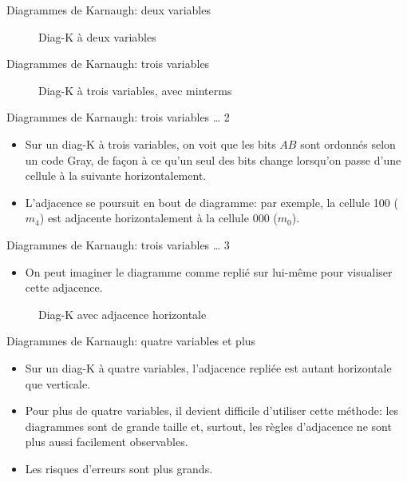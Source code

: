 \documentclass[presentation]{beamer}
\begin{document}
\begin{frame}[label={sec:org0bd4562}]{Diagrammes de Karnaugh: deux variables}
\begin{figure}[htbp]
\centering

\caption{\label{fig:orgc855133}Diag-K à deux variables}
\end{figure}
\end{frame}

\begin{frame}[label={sec:org5d40564}]{Diagrammes de Karnaugh: trois variables}
\begin{figure}[htbp]
\centering

\caption{\label{fig:org7891238}Diag-K à trois variables, avec minterms}
\end{figure}
\end{frame}

\begin{frame}[label={sec:org5b79337}]{Diagrammes de Karnaugh: trois variables \ldots{} 2}
\begin{itemize}
\item Sur un diag-K à trois variables, on voit que les bits \(AB\) sont ordonnés selon un code Gray, de façon à ce qu'un seul des bits change lorsqu'on passe d'une cellule à la suivante horizontalement.

\item L'adjacence se poursuit en bout de diagramme: par exemple, la cellule 100 (\(m_4\)) est adjacente horizontalement à la cellule 000 (\(m_0\)).
\end{itemize}
\end{frame}

\begin{frame}[label={sec:org92ecf27}]{Diagrammes de Karnaugh: trois variables \ldots{} 3}
\begin{itemize}
\item On peut imaginer le diagramme comme replié sur lui-même pour visualiser cette adjacence.
\end{itemize}

\begin{figure}[htbp]
\centering

\caption{\label{fig:org7da8eef}Diag-K avec adjacence horizontale}
\end{figure}
\end{frame}

\begin{frame}[label={sec:orgd840be1}]{Diagrammes de Karnaugh: quatre variables et plus}
\begin{itemize}
\item Sur un diag-K à quatre variables, l'adjacence repliée est autant horizontale que verticale.

\item Pour plus de quatre variables, il devient difficile d'utiliser cette méthode: les diagrammes sont de grande taille et, surtout, les règles d'adjacence ne sont plus aussi facilement observables.

\item Les risques d'erreurs sont plus grands.
\end{itemize}
\end{frame}
\end{document}
